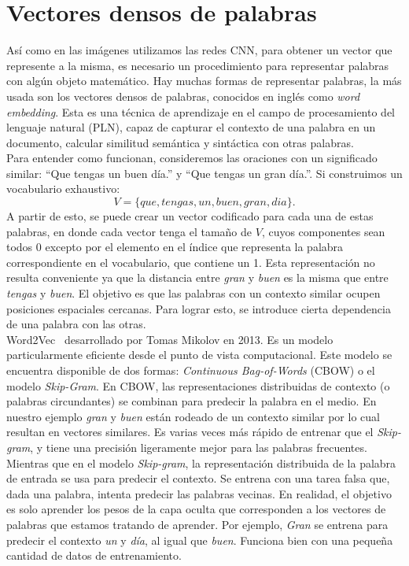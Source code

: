 \section{Vectores densos de palabras} \label{sec:vectoresdensosdepalabras}
Así como en las imágenes utilizamos las redes CNN, para obtener un vector que represente a la misma, es necesario un procedimiento para representar palabras con algún objeto matemático. Hay muchas formas de representar palabras, la más usada son los vectores densos de palabras, conocidos en inglés como \textit{word embedding}. Esta es una técnica de aprendizaje en el campo de procesamiento del lenguaje natural (PLN), capaz de capturar el contexto de una palabra en un documento, calcular similitud semántica y sintáctica con otras palabras.\\

Para entender como funcionan, consideremos las oraciones con un significado similar: ``Que tengas un buen día.'' y ``Que tengas un gran día.''. Si construimos un vocabulario exhaustivo:
 \[ V = \{que, tengas, un, buen, gran, dia\}. \]
A partir de esto, se puede crear un vector codificado para cada una de estas palabras, en donde cada vector tenga el tamaño de $V$, cuyos componentes sean todos 0 excepto por el elemento en el índice que representa la palabra correspondiente en el vocabulario, que contiene un 1. Esta representación no resulta conveniente ya que la distancia entre \textit{gran} y \textit{buen} es la misma que entre \textit{tengas} y \textit{buen}.  El objetivo es que las palabras con un contexto similar ocupen posiciones espaciales cercanas. Para lograr esto, se introduce cierta dependencia de una palabra con las otras.\\

Word2Vec~\cite{mikolov2013distributed} desarrollado por Tomas Mikolov en 2013. Es un modelo particularmente eficiente desde el punto de vista computacional. Este modelo se encuentra disponible de dos formas: \textit{Continuous Bag-of-Words} (CBOW) o el modelo \textit{Skip-Gram}. En CBOW, las representaciones distribuidas de contexto (o palabras circundantes) se combinan para predecir la palabra en el medio. En nuestro ejemplo \textit{gran} y \textit{buen} están rodeado de un contexto similar por lo cual resultan en vectores similares. Es varias veces más rápido de entrenar que el \textit{Skip-gram}, y tiene una precisión ligeramente mejor para las palabras frecuentes. Mientras que en el modelo \textit{Skip-gram}, la representación distribuida de la palabra de entrada se usa para predecir el contexto. Se entrena con una tarea falsa que, dada una palabra, intenta predecir las palabras vecinas. En realidad, el objetivo es solo aprender los pesos de la capa oculta que corresponden a los vectores de palabras que estamos tratando de aprender. Por ejemplo, \textit{Gran} se entrena para predecir el contexto \textit{un} y  \textit{día}, al igual que \textit{buen}. Funciona bien con una pequeña cantidad de datos de entrenamiento.


